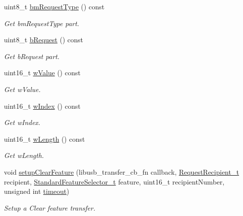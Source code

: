 \begin{DoxyCompactItemize}
uint8\-\_\-t \hyperlink{classmdt_usb_control_transfer_adedb82c8d1719e1c618e682f14759a56}{bm\-Request\-Type} () const 
\begin{DoxyCompactList}\small\item\em Get bm\-Request\-Type part. \end{DoxyCompactList}\item 
uint8\-\_\-t \hyperlink{classmdt_usb_control_transfer_acad163ec6dd2f3172b844115fb0bbfb9}{b\-Request} () const 
\begin{DoxyCompactList}\small\item\em Get b\-Request part. \end{DoxyCompactList}\item 
uint16\-\_\-t \hyperlink{classmdt_usb_control_transfer_aba33b977514458a3413a2fe12fe3b5c8}{w\-Value} () const 
\begin{DoxyCompactList}\small\item\em Get w\-Value. \end{DoxyCompactList}\item 
uint16\-\_\-t \hyperlink{classmdt_usb_control_transfer_af27548b7789b53a6bac3051ffca018a9}{w\-Index} () const 
\begin{DoxyCompactList}\small\item\em Get w\-Index. \end{DoxyCompactList}\item 
uint16\-\_\-t \hyperlink{classmdt_usb_control_transfer_a673c61f2bead515c3f11f588bb203e03}{w\-Length} () const 
\begin{DoxyCompactList}\small\item\em Get w\-Length. \end{DoxyCompactList}\item 
void \hyperlink{classmdt_usb_control_transfer_a86dfa7a329f14672611ee62e23987fdd}{setup\-Clear\-Feature} (libusb\-\_\-transfer\-\_\-cb\-\_\-fn callback, \hyperlink{classmdt_usb_control_transfer_a372afc0db22a4ec839bab18cfbed35c5}{Request\-Recipient\-\_\-t} recipient, \hyperlink{classmdt_usb_control_transfer_acae7a9c10825dd7fa7695a16986a2f36}{Standard\-Feature\-Selector\-\_\-t} feature, uint16\-\_\-t recipient\-Number, unsigned int \hyperlink{classmdt_usb_transfer_a3262511f6062348132e7ee689c24226c}{timeout})
\begin{DoxyCompactList}\small\item\em Setup a Clear feature transfer. \end{DoxyCompactList}\end{DoxyCompactItemize}

